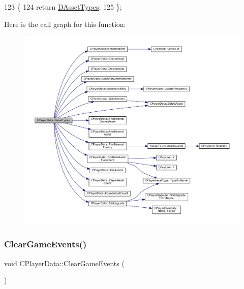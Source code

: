 \begin{DoxyCode}
123                                                                                                        \{
124             \textcolor{keywordflow}{return} \hyperlink{classCPlayerData_ad922f283c60b1c885dac955815ae2b05}{DAssetTypes};
125         \};
\end{DoxyCode}
Here is the call graph for this function\+:
\nopagebreak
\begin{figure}[H]
\begin{center}
\leavevmode
\includegraphics[width=350pt]{classCPlayerData_adbe01c300ec2d40267ca84c7529b9045_cgraph}
\end{center}
\end{figure}
\hypertarget{classCPlayerData_a74cbe8bf72037ca113c9c40ae7bca5ec}{}\label{classCPlayerData_a74cbe8bf72037ca113c9c40ae7bca5ec} 
\subsubsection{\texorpdfstring{Clear\+Game\+Events()}{ClearGameEvents()}}
{\footnotesize\ttfamily void C\+Player\+Data\+::\+Clear\+Game\+Events (\begin{DoxyParamCaption}{ }\end{DoxyParamCaption})\hspace{0.3cm}{\ttfamily [inline]}}



